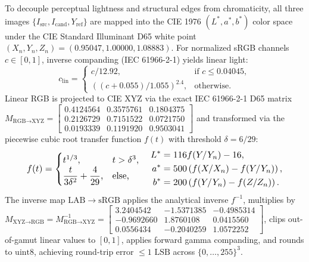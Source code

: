 \documentclass[conference,10pt]{IEEEtran}
\begin{document}
To decouple perceptual lightness and structural edges from chromaticity, all three images $\{I_{\text{src}}, I_{\text{cand}}, Y_{\text{ref}}\}$ are mapped into the CIE 1976 $(L^*, a^*, b^*)$ color space under the CIE Standard Illuminant D65 white point $(X_n, Y_n, Z_n) = (0.95047, 1.00000, 1.08883)$. For normalized sRGB channels $c \in [0, 1]$, inverse companding (IEC 61966-2-1) yields linear light:
\begin{equation}
\label{eq:srgb_linear}
c_{\text{lin}} = \begin{cases}
c / 12.92, & \text{if } c \le 0.04045, \\
\left((c + 0.055) / 1.055\right)^{2.4}, & \text{otherwise.}
\end{cases}
\end{equation}
Linear RGB is projected to CIE XYZ via the exact IEC 61966-2-1 D65 matrix $M_{\text{RGB}\to\text{XYZ}} = \left[\begin{smallmatrix} 0.4124564 & 0.3575761 & 0.1804375 \\ 0.2126729 & 0.7151522 & 0.0721750 \\ 0.0193339 & 0.1191920 & 0.9503041 \end{smallmatrix}\right]$ and transformed via the piecewise cubic root transfer function $f(t)$ with threshold $\delta = 6/29$:
\begin{equation}
\label{eq:lab_forward}
\resizebox{0.89\columnwidth}{!}{$\displaystyle
f(t) = \begin{cases}
t^{1/3}, & t > \delta^3, \\
\dfrac{t}{3\delta^2} + \dfrac{4}{29}, & \text{else,}
\end{cases}
\quad
\begin{aligned}
L^* &= 116 f(Y/Y_n) - 16, \\
a^* &= 500 \left(f(X/X_n) - f(Y/Y_n)\right), \\
b^* &= 200 \left(f(Y/Y_n) - f(Z/Z_n)\right).
\end{aligned}
$}
\end{equation}
The inverse map $\mathrm{LAB}\to\mathrm{sRGB}$ applies the analytical inverse $f^{-1}$, multiplies by $M_{\text{XYZ}\to\text{RGB}} = M_{\text{RGB}\to\text{XYZ}}^{-1} = \left[\begin{smallmatrix} 3.2404542 & -1.5371385 & -0.4985314 \\ -0.9692660 & 1.8760108 & 0.0415560 \\ 0.0556434 & -0.2040259 & 1.0572252 \end{smallmatrix}\right]$, clips out-of-gamut linear values to $[0,1]$, applies forward gamma companding, and rounds to $\mathrm{uint8}$, achieving round-trip error $\le 1\text{ LSB}$ across $\{0,\dots,255\}^3$.
\end{document}
